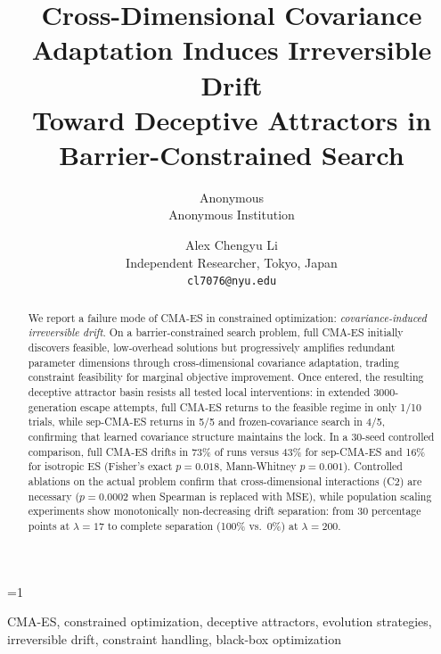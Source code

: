 \documentclass[twoside,11pt]{article}
\newcommand{\blindmode}{0}
\newcommand{\blindmode}{1}
\begin{document}
\title{Cross-Dimensional Covariance Adaptation Induces Irreversible Drift\\
Toward Deceptive Attractors in Barrier-Constrained Search}

\ifnum\blindmode=1
  \author{\name Anonymous \\
         \addr Anonymous Institution}
\else
  \author{\name Alex Chengyu Li \\
         \addr Independent Researcher, Tokyo, Japan \\
         \addr \texttt{cl7076@nyu.edu}}
\fi

\editor{}

\maketitle

\begin{abstract}
We report a failure mode of CMA-ES in constrained optimization:
\emph{covariance-induced irreversible drift}. On a barrier-constrained
search problem, full CMA-ES initially discovers feasible,
low-overhead solutions but progressively amplifies redundant parameter
dimensions through cross-dimensional covariance adaptation, trading
constraint feasibility for marginal objective improvement. Once entered,
the resulting deceptive attractor basin resists all tested local
interventions: in extended 3000-generation escape attempts, full CMA-ES
returns to the feasible regime in only 1/10 trials, while sep-CMA-ES
returns in 5/5 and frozen-covariance search in 4/5, confirming that
learned covariance structure maintains the lock. In a 30-seed controlled
comparison, full CMA-ES drifts in
73\% of runs versus 43\% for sep-CMA-ES and 16\% for isotropic ES
(Fisher's exact $p = 0.018$, Mann-Whitney $p = 0.001$).
Controlled ablations on the actual problem confirm that cross-dimensional
interactions (C2) are necessary ($p = 0.0002$ when Spearman is replaced
with MSE), while population scaling experiments show monotonically
non-decreasing drift separation: from 30 percentage points at $\lambda = 17$
to complete separation (100\% vs.\ 0\%) at $\lambda = 200$.
\end{abstract}

\begin{keywords}
  CMA-ES, constrained optimization, deceptive attractors, evolution strategies,
  irreversible drift, constraint handling, black-box optimization
\end{keywords}

\end{document}
